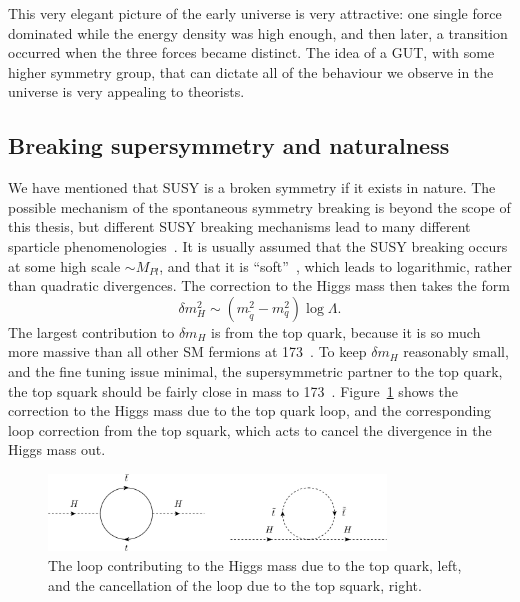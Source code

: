This very elegant picture of the early universe is very attractive: one single force dominated while the energy density was high enough, and then later, a transition occurred when the three forces became distinct.
The idea of a \ac{GUT}, with some higher symmetry group, that can dictate all of the behaviour we observe in the universe is very appealing to theorists.


\subsection{Breaking supersymmetry and naturalness \label{th:susyBreaking}}

We have mentioned that \ac{SUSY} is a broken symmetry if it exists in nature.
The possible mechanism of the spontaneous symmetry breaking is beyond the scope of this thesis, 
but different \ac{SUSY} breaking mechanisms lead to many different sparticle phenomenologies~\cite{susyMot2}. 
It is usually assumed that the \ac{SUSY} breaking occurs at some high scale $\sim M_{Pl}$, and that it is ``soft''~\cite{softsusy}, which leads to logarithmic, rather than quadratic divergences.
The correction to the Higgs mass then takes the form
\begin{equation}
\delta m_{H}^{2} \sim \left( m_{\tilde{q}}^{2} - m_{q}^{2} \right) \log{\Lambda}.
\end{equation}
The largest contribution to $\delta m_{H}$ is from the top quark, 
because it is so much more massive than all other \ac{SM} fermions at 173~\GeV.
To keep $\delta m_{H}$ reasonably small, and the fine tuning issue minimal, the supersymmetric partner to the top quark, the top squark \sTop{} should be fairly close in mass to 173~\GeV.
Figure~\ref{fig:SUSYmot} shows the correction to the Higgs mass due to the top quark loop, and the corresponding loop correction from the top squark, which acts to cancel the divergence in the Higgs mass out.

\begin{figure}[htbp]
  \begin{center}
  \includegraphics[width=0.8\textwidth]{Figures/theory/SUSYmot}
  \caption{The loop contributing to the Higgs mass due to the top quark, left, and the cancellation of the loop due to the top squark, right.}
  \label{fig:SUSYmot}
  \end{center}
\end{figure}

